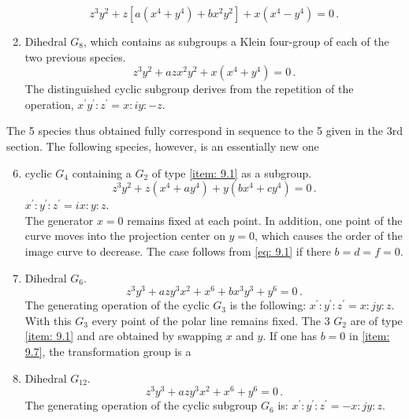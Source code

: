 \documentclass[leqno]{article}
\begin{document}
\begin{enumerate}[label=\arabic*)]
    \begin{equation}\label{eq: 9.4}
        z^3 y^2 + z[a(x^4 + y^4) + bx^2 y^2] + x(x^4 - y^4) = 0 \, . \tag{4}
    \end{equation}
    \item \label{item: 9.5}Dihedral $G_8$, which contains as subgroups a Klein four-group of each of the two previous species.
    \begin{equation}\label{eq: 9.5}
        z^3 y^2 + a z x^2 y^2 + x(x^4 + y^4)= 0 \, . \tag{5}
    \end{equation}
    The distinguished cyclic subgroup derives from the repetition of the operation, $x^\prime y^\prime : z^\prime = x : iy : -z$.
\end{enumerate}
The 5 species thus obtained fully correspond in sequence to the 5 given in the 3rd section. The following species, however, is an essentially new one
\begin{enumerate}[label=\arabic*)]
    \setcounter{enumi}{5}
    \item \label{item: 9.6}cyclic $G_4$ containing a $G_2$ of type \ref{item: 9.1} as a subgroup.
    \begin{equation}\label{eq: 9.6}
        z^3 y^2 + z(x^4 + a y^4) + y(bx^4 + c y^4) = 0 \, . \tag{6}
    \end{equation}
    $x^\prime : y^\prime : z^\prime = ix : y : z$. \\
    The generator $x=0$ remains fixed at each point. In addition, one point of the curve moves into the projection center on $y=0$, which causes the order of the image curve to decrease. The case follows from \eqref{eq: 9.1} if there $b=d=f=0$.
    \item \label{item: 9.7}Dihedral $G_6$. 
    \begin{equation}\label{eq: 9.7}
        z^3 y^3 + a z y^3 x^2 + x^6 + b x^3 y^3 + y^6 = 0 \, . \tag{7} 
    \end{equation}
    The generating operation of the cyclic $G_3$ is the following: $x^\prime : y^\prime : z^\prime = x : jy : z$. With this $G_3$ every point of the polar line remains fixed. The 3 $G_2$ are of type \ref{item: 9.1} and are obtained by swapping $x$ and $y$. If one has $b=0$ in \ref{item: 9.7}, the transformation group is a 
    \item \label{item: 9.8}Dihedral $G_{12}$. 
    \begin{equation}\label{eq: 9.8}
        z^3 y^3 + a z y^3 x^2 + x^6 + y^6 = 0 \, . \tag{8}
    \end{equation}
    The generating operation of the cyclic subgroup $G_6$ is: $x^\prime : y^\prime : z^\prime = -x : jy : z$. 
\end{enumerate}
\end{document}
